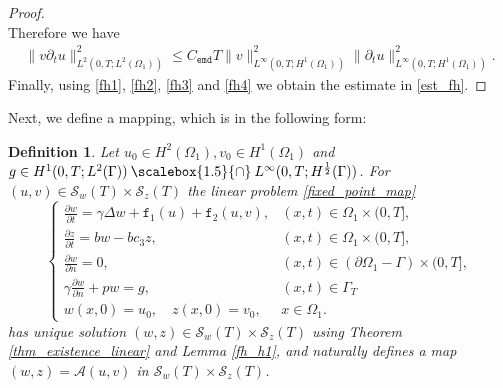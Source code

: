 \documentclass[11pt]{article}
\newcommand*{\medcap}{\mathbin{\scalebox{1.5}{\ensuremath{\cap}}}}
\newtheorem{definition}[theorem]{Definition}
\begin{document}
\begin{proof}
\begin{equation*}
\end{equation*}
Therefore we have 
\begin{equation}\label{fh4}
\begin{aligned}
\parallel v\partial_t u\parallel_{ L^2(0,T; L^2(\Omega_1))}^2\leq C_{\texttt{emd}}T\parallel v\parallel_{L^{\infty}(0,T; H^{1}(\Omega_1))}^2  \parallel \partial_t u\parallel_{L^{\infty}(0,T; H^1(\Omega_1))}^2.
\end{aligned}
\end{equation} 
Finally, using \eqref{fh1}, \eqref{fh2}, \eqref{fh3} and \eqref{fh4} we obtain the estimate in \eqref{est_fh}.
\end{proof}

Next, we define a mapping, which is in the following form:
\begin{definition}
Let $u_0\in H^2(\Omega_1), v_0\in H^1(\Omega_1)$ and $g\in H^1(0, T;L^2(\Gamma))\medcap L^{\infty}(0, T;H^{\frac{1}{2}}(\Gamma))$. For $(u, v)\in \mathcal{S}_w(T) \times \mathcal{S}_z(T)$ the linear problem \eqref{fixed_point_map}
\begin{equation}\label{fixed_point_map}
\begin{cases}
\frac{\partial w}{\partial t}  = \gamma \Delta w + \mathtt{f}_1(u) + \mathtt{f}_2(u, v), & (x,t)\in\Omega_1\times(0,T],\\
\frac{\partial z}{\partial t} = bw - bc_3z , & (x,t)\in\Omega_1\times(0,T],\\
\frac{\partial w}{\partial n}=0, & (x,t)\in\left(\partial\Omega_1 - \Gamma\right)\times(0,T],\\
\gamma\frac{\partial w}{\partial n} + pw
 = g,  & (x,t)\in\Gamma_T\\
w(x,0)=u_0, \quad 
z(x,0)=v_0, & x\in \Omega_1.
\end{cases}
\end{equation}
has unique solution $(w, z)\in \mathcal{S}_w(T) \times \mathcal{S}_z(T)$ using Theorem \eqref{thm_existence_linear} and Lemma \eqref{fh_h1}, and naturally defines a map $(w, z) = \mathcal{A}(u, v)$ in $\mathcal{S}_w(T) \times \mathcal{S}_z(T)$.
\end{definition}
\end{document}
